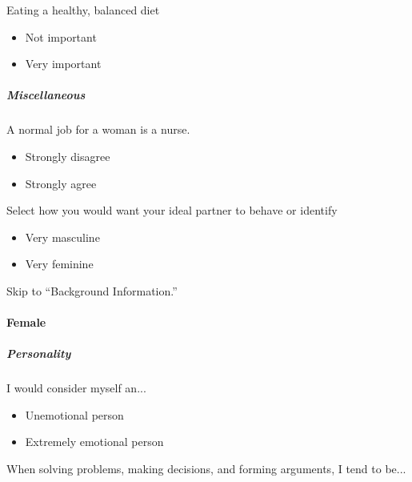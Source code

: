 \documentclass[twoside]{report}
\begin{document}
\begin{multicols}{2}
 Eating a healthy, balanced diet

 \begin{itemize}
  \item
        Not important
 \end{itemize}

 \begin{itemize}
  \item
        Very important
 \end{itemize}

 \subparagraph{Miscellaneous}

 A normal job for a woman is a nurse.

 \begin{itemize}
  \item
        Strongly disagree
 \end{itemize}

 \begin{itemize}
  \item
        Strongly agree
 \end{itemize}

 Select how you would want your ideal partner to behave or identify

 \begin{itemize}
  \item
        Very masculine
 \end{itemize}

 \begin{itemize}
  \item
        Very feminine
 \end{itemize}

 Skip to ``Background Information.''

 \paragraph{Female}

 \subparagraph{Personality}

 I would consider myself an...

 \begin{itemize}
  \item
        Unemotional person
 \end{itemize}

 \begin{itemize}
  \item
        Extremely emotional person
 \end{itemize}

 When solving problems, making decisions, and forming arguments, I tend to be...


\end{multicols}
\end{document}
